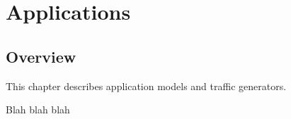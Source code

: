 \chapter{Applications}
\label{cha:apps}


\section{Overview}

This chapter describes application models and traffic generators.

Blah blah blah



